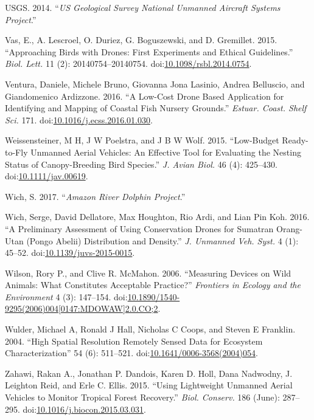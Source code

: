 \documentclass[]{interact}
\theoremstyle{plain}%
\theoremstyle{definition}
\theoremstyle{remark}
\begin{document}
\hypertarget{ref-USGS2014}{}
USGS. 2014. ``\emph{US Geological Survey National Unmanned Aircraft
Systems Project}.''

\hypertarget{ref-vas_approaching_2015}{}
Vas, E., A. Lescroel, O. Duriez, G. Boguszewski, and D. Gremillet. 2015.
``Approaching Birds with Drones: First Experiments and Ethical
Guidelines.'' \emph{Biol. Lett.} 11 (2): 20140754--20140754.
doi:\href{https://doi.org/10.1098/rsbl.2014.0754}{10.1098/rsbl.2014.0754}.

\hypertarget{ref-ventura_low-cost_2016}{}
Ventura, Daniele, Michele Bruno, Giovanna Jona Lasinio, Andrea
Belluscio, and Giandomenico Ardizzone. 2016. ``A Low-Cost Drone Based
Application for Identifying and Mapping of Coastal Fish Nursery
Grounds.'' \emph{Estuar. Coast. Shelf Sci.} 171.
doi:\href{https://doi.org/10.1016/j.ecss.2016.01.030}{10.1016/j.ecss.2016.01.030}.

\hypertarget{ref-weissensteiner_low-budget_2015}{}
Weissensteiner, M H, J W Poelstra, and J B W Wolf. 2015. ``Low-Budget
Ready-to-Fly Unmanned Aerial Vehicles: An Effective Tool for Evaluating
the Nesting Status of Canopy-Breeding Bird Species.'' \emph{J. Avian
Biol.} 46 (4): 425--430.
doi:\href{https://doi.org/10.1111/jav.00619}{10.1111/jav.00619}.

\hypertarget{ref-WichS2017}{}
Wich, S. 2017. ``\emph{Amazon River Dolphin Project}.''

\hypertarget{ref-wich_preliminary_2016}{}
Wich, Serge, David Dellatore, Max Houghton, Rio Ardi, and Lian Pin Koh.
2016. ``A Preliminary Assessment of Using Conservation Drones for
Sumatran Orang-Utan (Pongo Abelii) Distribution and Density.'' \emph{J.
Unmanned Veh. Syst.} 4 (1): 45--52.
doi:\href{https://doi.org/10.1139/juvs-2015-0015}{10.1139/juvs-2015-0015}.

\hypertarget{ref-wilson_measuring_2006}{}
Wilson, Rory P., and Clive R. McMahon. 2006. ``Measuring Devices on Wild
Animals: What Constitutes Acceptable Practice?'' \emph{Frontiers in
Ecology and the Environment} 4 (3): 147--154.
doi:\href{https://doi.org/10.1890/1540-9295(2006)004\%5B0147:MDOWAW\%5D2.0.CO;2}{10.1890/1540-9295(2006)004{[}0147:MDOWAW{]}2.0.CO;2}.

\hypertarget{ref-wulder_high_2004}{}
Wulder, Michael A, Ronald J Hall, Nicholas C Coops, and Steven E
Franklin. 2004. ``High Spatial Resolution Remotely Sensed Data for
Ecosystem Characterization'' 54 (6): 511--521.
doi:\href{https://doi.org/10.1641/0006-3568(2004)054}{10.1641/0006-3568(2004)054}.

\hypertarget{ref-zahawi_using_2015}{}
Zahawi, Rakan A., Jonathan P. Dandois, Karen D. Holl, Dana Nadwodny, J.
Leighton Reid, and Erle C. Ellis. 2015. ``Using Lightweight Unmanned
Aerial Vehicles to Monitor Tropical Forest Recovery.'' \emph{Biol.
Conserv.} 186 (June): 287--295.
doi:\href{https://doi.org/10.1016/j.biocon.2015.03.031}{10.1016/j.biocon.2015.03.031}.
\end{document}
